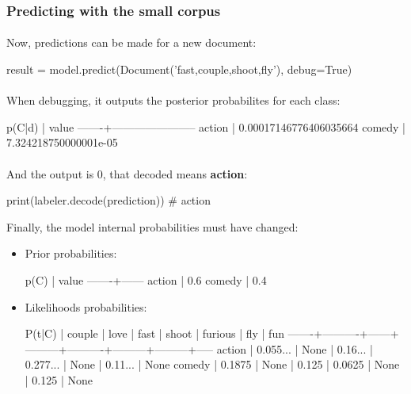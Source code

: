 \documentclass{article}
\begin{document}
\clearpage

\subsubsection*{Predicting with the small corpus}

\paragraph{} Now, predictions can be made for a new document:

\begin{python}
result = model.predict(Document('fast,couple,shoot,fly'), debug=True)
\end{python}

\paragraph{} When debugging, it outputs the posterior probabilites for each class:

\begin{python}
p(C|d) |                  value
-------+-----------------------
action | 0.00017146776406035664
comedy |  7.324218750000001e-05
\end{python}

\paragraph{} And the output is 0, that decoded means \textbf{action}:

\begin{python}
print(labeler.decode(prediction))
# action
\end{python}

Finally, the model internal probabilities must have changed:

\begin{itemize}
\item Prior probabilities:
\begin{python}
p(C)   | value
-------+------
action |   0.6
comedy |   0.4
\end{python}
\item Likelihoods probabilities:
\begin{python}
P(t|C) |   couple | love |    fast |    shoot | furious |     fly |  fun
-------+----------+------+---------+----------+---------+---------+-----
action | 0.055... | None | 0.16... | 0.277... |    None | 0.11... | None
comedy |   0.1875 | None |   0.125 |   0.0625 |    None |   0.125 | None
\end{python}
\end{itemize}
\end{document}

